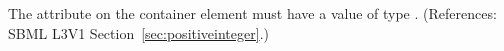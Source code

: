 The attribute  on the  container element
must have a value of type .  (References: SBML
L3V1 Section~\ref{sec:positiveinteger}.)
